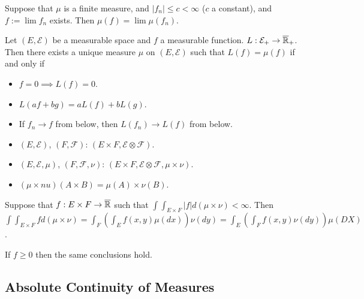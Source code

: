 \documentclass[12pt, titlepage]{article}
\begin{document}
\begin{theo}{}
	Suppose that $\mu$ is a finite measure, and $|f_n| \leq c < \infty$ ($c$ a constant), and $f:= \lim f_n$ exists. Then $\mu(f) = \lim \mu(f_n)$.
\end{theo}

\begin{theo}[]{}
	Let $(E, \mathcal{E})$ be a measurable space and $f$ a measurable function. $L: \mathcal{E}_+ \to \overline{\mathbb{R}}_+$. Then there exists a unique measure $\mu$ on $(E, \mathcal{E})$ such that $L(f) = \mu(f)$ if and only if
	
	\begin{itemize}
		\item $f = 0 \implies L(f) = 0$.
		\item $L(af + bg) = aL(f) + bL(g)$.
		\item If $f_n \to f$ from below, then $L(f_n) \to L(f)$ from below.
	\end{itemize}
\end{theo}

\begin{info}{}
	\begin{itemize}
		\item $(E, \mathcal{E})$, $(F, \mathcal{F})$: $(E \times F, \mathcal{E} \otimes \mathcal{F})$.
		\item $(E, \mathcal{E}, \mu)$, $(F, \mathcal{F}, \nu)$: $(E \times F, \mathcal{E} \otimes \mathcal{F}, \mu \times \nu)$.
		\item $(\mu \times nu)(A \times B) = \mu(A) \times \nu(B)$.
	\end{itemize}
\end{info}

\begin{theo}[Fubini]{}
	Suppose that $f: E \times F \to \overline{\mathbb{R}}$ such that $\int \int_{E \times F} |f| d(\mu \times \nu) < \infty$. Then $\int \int_{E \times F} f d(\mu \times \nu) = \int_F (\int_E f(x, y) \mu(dx)) \nu(dy) = \int_E (\int_F f(x, y) \nu(dy)) \mu(DX)$.\\
\end{theo}

\begin{theo}[Tonelli]{}
	If $f \geq 0$ then the same conclusions hold.
\end{theo}

\subsection{Absolute Continuity of Measures}
\end{document}
